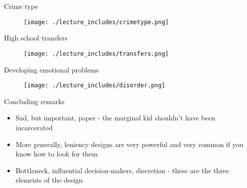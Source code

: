 \documentclass{beamer}
\begin{document}
\begin{frame}{Crime type}
	
	\begin{figure}
	\texttt{[image: ./lecture\_includes/crimetype.png]}
	\end{figure}
\end{frame}


\begin{frame}{High school transfers}
	
	\begin{figure}
	\texttt{[image: ./lecture\_includes/transfers.png]}
	\end{figure}
\end{frame}


\begin{frame}{Developing emotional problems}
	
	\begin{figure}
	\texttt{[image: ./lecture\_includes/disorder.png]}
	\end{figure}
\end{frame}


\begin{frame}{Concluding remarks}

	\begin{itemize}
	\item Sad, but important, paper - the marginal kid shouldn't have been incarcerated
	\item More generally, leniency designs are very powerful and very common if you know how to look for them
	\item Bottleneck, influential decision-makers, discretion - these are the three elements of the design
	\end{itemize}

\end{frame}
\end{document}
